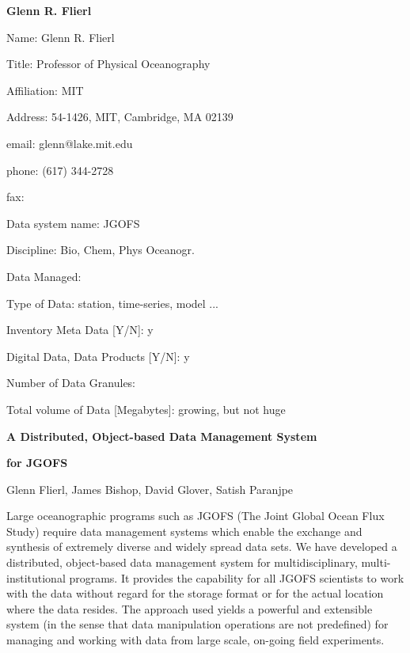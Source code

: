 \begin{center}
\LARGE
{\bf  Glenn R. Flierl}
\end{center}
\large
{}
\normalsize
\smallskip
\begin{description}
\item{Name:}  Glenn R. Flierl
\item{Title:}  Professor of Physical Oceanography
\item{Affiliation:}  MIT
\item{Address:}  54-1426, MIT, Cambridge, MA 02139
\item{email:}  glenn@lake.mit.edu
\item{phone:}  (617) 344-2728
\item{fax:}
\end{description}
\medskip
\large
{}
\normalsize
\medskip
\begin{description}

\item{Data system name:}  JGOFS
\item{Discipline:}  Bio, Chem, Phys Oceanogr.
\item{Data Managed:}
	\begin{description}
	\item{Type of Data:}  station, time-series, model ...
	\item{Inventory Meta Data [Y/N]:}  y
	\item{Digital Data, Data Products [Y/N]:}  y
	\item{Number of Data Granules:}
	\item{Total volume of Data [Megabytes]:}  growing, but not huge
	\end{description}
\end{description}

\medskip
\large
{}
\medskip

\centerline{\bf A Distributed, Object-based Data Management System}
\centerline {\bf for JGOFS}
\centerline {Glenn Flierl, James Bishop, David Glover, Satish Paranjpe}

\medskip
\normalsize
Large oceanographic programs such as JGOFS (The Joint Global Ocean Flux 
Study) require data management systems which enable the exchange and 
synthesis of extremely diverse and widely spread data sets. We have 
developed a distributed, object-based data management system for 
multidisciplinary, multi-institutional programs. It provides the capability 
for all JGOFS scientists to work with the data without regard for the 
storage format or for the actual location where the data resides.  The 
approach used yields a powerful and extensible system (in the sense that 
data manipulation operations are not predefined) for managing and 
working with data from large scale, on-going field experiments.

